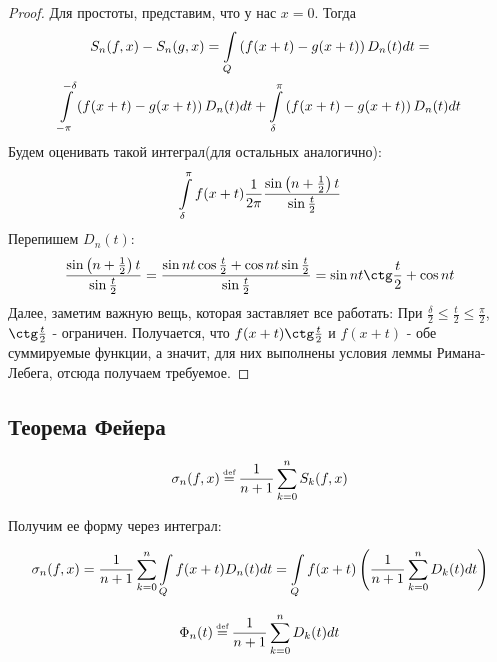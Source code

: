 \begin{proof}
	Для простоты, представим, что у нас $x = 0$. Тогда
	\begin{gather*}
		S_n(f, x) - S_n(g, x) = \int\limits_{Q} \left(f(x + t) - g(x + t) \right) D_n(t) dt = \\
		\int\limits_{-\pi}^{-\delta} \left(f(x + t) - g(x + t) \right) D_n(t) dt +
		\int\limits_{\delta}^{\pi} \left(f(x + t) - g(x + t) \right) D_n(t) dt
	\end{gather*}
	Будем оценивать такой интеграл(для остальных аналогично):
	\begin{gather*}
		\int\limits_{\delta}^{\pi}f(x + t) \frac{1}{2\pi}
		\frac{\sin \left(n + \frac{1}{2} \right) t}{\sin \frac{t}{2}}
	\end{gather*}
	Перепишем $D_n(t)$:
	\begin{gather*}
		\frac{\sin \left(n + \frac{1}{2} \right) t}{\sin \frac{t}{2}} =
		\frac{\sin nt \cos \frac{t}{2} + \cos nt \sin \frac{t}{2}}{\sin\frac{t}{2}} = 
		\sin nt\ctg\frac{t}{2} + \cos nt
	\end{gather*}
	Далее, заметим важную вещь, которая заставляет все работать:
	При $\frac{\delta}{2} \leqslant \frac{t}{2} \leqslant \frac{\pi}{2}$, $\ctg\frac{t}{2}$ - ограничен.
	Получается, что $f(x + t)\ctg \frac{t}{2}$ и $f(x + t)$ - обе суммируемые функции, 
	а значит, для них выполнены условия леммы Римана-Лебега, отсюда получаем требуемое.
\end{proof}

\subsection{Теорема Фейера}

\begin{definition}
	\begin{gather*}
		\sigma_n(f, x) \defeq \frac{1}{n + 1} \sumlr{k = 0}{n} S_k(f, x)
	\end{gather*}
\end{definition}

Получим ее форму через интеграл:

\begin{gather*}
	\sigma_n(f, x) = \frac{1}{n + 1} \sum\limits_{k = 0}^{n} \int\limits_{Q} f(x + t)D_n(t) dt = 
	\int\limits_{Q} f(x + t) \left( \frac{1}{n + 1} \sum\limits_{k = 0}^{n} D_k(t)dt\right)
\end{gather*}

\begin{definition}
	\begin{gather*}
		\Phi_n(t) \defeq  \frac{1}{n + 1} \sumlr{k = 0}{n} D_k(t)dt
	\end{gather*}
\end{definition}

